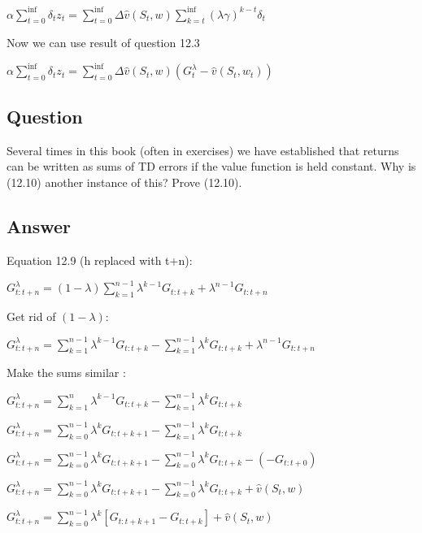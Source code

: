 \documentclass[11pt]{article}
\begin{document}
    \noindent $  \alpha \sum_{t=0}^{\inf} \delta_t z_t =  \sum_{t=0}^{\inf} \Delta\hat{v}(S_t, w) \sum_{k=t}^{\inf} (\lambda \gamma)^{k-t} \delta_{t} $


    \hfill \break
    \noindent Now we can use result of question 12.3

    \noindent $  \alpha \sum_{t=0}^{\inf} \delta_t z_t =  \sum_{t=0}^{\inf} \Delta\hat{v}(S_t, w) (G_{t}^{\lambda} - \hat{v}(S_t, w_t)) $


    \subsection{Question}

    Several times in this book (often in exercises) we have established that returns can be written as sums of TD errors if the value function is held constant.
    Why is (12.10) another instance of this?
    Prove (12.10).

    \subsection*{Answer}

    \noindent Equation 12.9 (h replaced with t+n):

    \noindent $ G_{t:t+n}^{\lambda} = (1-\lambda) \sum_{k=1}^{n-1} \lambda^{k-1} G_{t:t+k} + \lambda^{n-1} G_{t:t+n} $

    \hfill \break
    \noindent Get rid of $ (1- \lambda) $:

    \noindent $ G_{t:t+n}^{\lambda} = \sum_{k=1}^{n-1} \lambda^{k-1} G_{t:t+k} - \sum_{k=1}^{n-1} \lambda^k G_{t:t+k} + \lambda^{n-1} G_{t:t+n} $

    \hfill \break
    \noindent Make the sums similar :

    \noindent $ G_{t:t+n}^{\lambda} = \sum_{k=1}^{n} \lambda^{k-1} G_{t:t+k} - \sum_{k=1}^{n-1} \lambda^k G_{t:t+k} $

    \noindent $ G_{t:t+n}^{\lambda} = \sum_{k=0}^{n-1} \lambda^{k} G_{t:t+k+1} - \sum_{k=1}^{n-1} \lambda^k G_{t:t+k} $

    \noindent $ G_{t:t+n}^{\lambda} = \sum_{k=0}^{n-1} \lambda^{k} G_{t:t+k+1} - \sum_{k=0}^{n-1} \lambda^k G_{t:t+k} - ( - G_{t:t+0} ) $

    \noindent $ G_{t:t+n}^{\lambda} = \sum_{k=0}^{n-1} \lambda^{k} G_{t:t+k+1} - \sum_{k=0}^{n-1} \lambda^k G_{t:t+k} + \hat{v}(S_t, w) $

    \noindent $ G_{t:t+n}^{\lambda} = \sum_{k=0}^{n-1} \lambda^{k} [G_{t:t+k+1} - G_{t:t+k}] + \hat{v}(S_t, w) $
\end{document}
